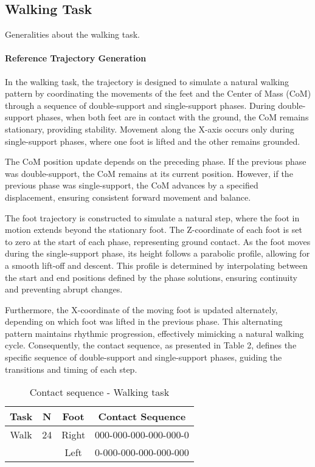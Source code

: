 \documentclass[main.tex]{subfiles}
\begin{document}
\subsection{Walking Task}
Generalities about the walking task. 
\paragraph{Reference Trajectory Generation}
In the walking task, the trajectory is designed to simulate a natural walking pattern by coordinating the movements of the feet and the Center of Mass (CoM) through a sequence of double-support and single-support phases. During double-support phases, when both feet are in contact with the ground, the CoM remains stationary, providing stability. Movement along the X-axis occurs only during single-support phases, where one foot is lifted and the other remains grounded.

The CoM position update depends on the preceding phase. If the previous phase was double-support, the CoM remains at its current position. However, if the previous phase was single-support, the CoM advances by a specified displacement, ensuring consistent forward movement and balance.

The foot trajectory is constructed to simulate a natural step, where the foot in motion extends beyond the stationary foot. The Z-coordinate of each foot is set to zero at the start of each phase, representing ground contact. As the foot moves during the single-support phase, its height follows a parabolic profile, allowing for a smooth lift-off and descent. This profile is determined by interpolating between the start and end positions defined by the phase solutions, ensuring continuity and preventing abrupt changes.

Furthermore, the X-coordinate of the moving foot is updated alternately, depending on which foot was lifted in the previous phase. This alternating pattern maintains rhythmic progression, effectively mimicking a natural walking cycle. Consequently, the contact sequence, as presented in Table 2, defines the specific sequence of double-support and single-support phases, guiding the transitions and timing of each step.

\begin{table}[h!]
    \label{tab:walkingtask}
    \centering
    \begin{tabular}{|c|c|c|c|}
        \hline
        Task & N & Foot & Contact Sequence \\
        \hline
        Walk & 24 & Right & 000-000-000-000-000-0 \\
        & & Left & 0-000-000-000-000-000 \\
        \hline
    \end{tabular}
    \caption{Contact sequence - Walking task}
\end{table}
\end{document}
